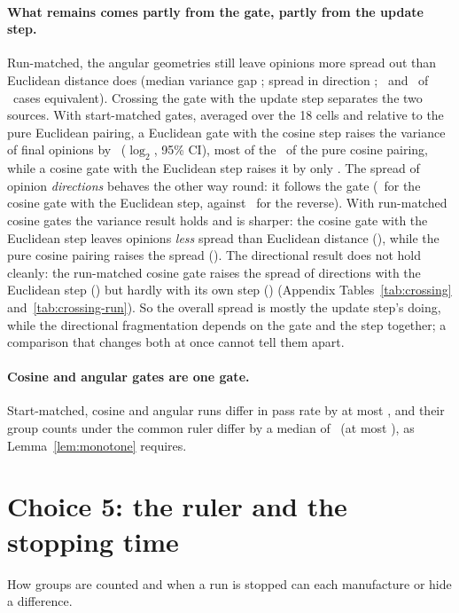 \documentclass[11pt]{article}
\begin{document}
\paragraph{What remains comes partly from the gate, partly from the update step.}
Run-matched, the angular geometries still leave opinions more spread out than Euclidean distance does (median variance gap \VRunVarGap; spread in direction \VRunDispGap; \VRunVarEquiv\ and \VRunDispEquiv\ of \VCases\ cases equivalent).
Crossing the gate with the update step separates the two sources.
With start-matched gates, averaged over the 18 cells and relative to the pure Euclidean pairing, a Euclidean gate with the cosine step raises the variance of final opinions by \VXEucCosVar\ ($\log_2$, 95\% CI), most of the \VXCosCosVar\ of the pure cosine pairing, while a cosine gate with the Euclidean step raises it by only \VXCosEucVar.
The spread of opinion \emph{directions} behaves the other way round: it follows the gate (\VXCosEucDisp\ for the cosine gate with the Euclidean step, against \VXEucCosDisp\ for the reverse).
With run-matched cosine gates the variance result holds and is sharper: the cosine gate with the Euclidean step leaves opinions \emph{less} spread than Euclidean distance (\VXRCosEucVar), while the pure cosine pairing raises the spread (\VXRCosCosVar).
The directional result does not hold cleanly: the run-matched cosine gate raises the spread of directions with the Euclidean step (\VXRCosEucDisp) but hardly with its own step (\VXRCosCosDisp) (Appendix Tables~\ref{tab:crossing} and~\ref{tab:crossing-run}).
So the overall spread is mostly the update step's doing, while the directional fragmentation depends on the gate and the step together; a comparison that changes both at once cannot tell them apart.

\paragraph{Cosine and angular gates are one gate.}
Start-matched, cosine and angular runs differ in pass rate by at most \VCosAngPassMax, and their group counts under the common ruler differ by a median of \VCosAngCommon\ (at most \VCosAngCommonMax), as Lemma~\ref{lem:monotone} requires.

\section{Choice 5: the ruler and the stopping time}
\label{sec:ruler}

How groups are counted and when a run is stopped can each manufacture or hide a difference.
\end{document}
